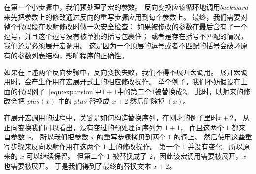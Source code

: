 在第一个小步骤中，我们预处理了宏的参数。
反向变换应该循环地调用$backward$来先把参数上的修改通过反向的重写步骤应用到每个参数上。
最终，我们需要对整个代码段在映射修改时做一次安全检查：
如果被修改的参数在最后含有了一个逗号，并且这个逗号没有被单独的括号包裹住；
或者是存在括号不匹配的情况，我们还是必须展开宏调用。
这是因为一个顶层的逗号或者不匹配的括号会破环原有的参数列表结构，影响程序的正确性。

如果在上述两个反向步骤中，反向变换失败，我们不得不展开宏调用。
展开宏调用时，会产生作用在宏展开式上的相应修改操作。
举个例子，我们不妨假设在上面的代码例子~\ref{eqn:expansion}中$1+1$中的第二个$1$被替换成$2$。
此时，映射来的修改会把 $plus(x)$ 中的 $plus$ 替换成 $x+2$ 然后删除掉 $(x)$。



在展开宏调用的过程中，关键是如何构造替换序列，在刚才的例子里时$x+2$。
从正向变换我们可以看出，没有变过的预处理词序列为 $1+1$， 
而且这两个 $1$ 都来自参数 $x$。
所以我们把参数 $x$ 的重写步骤拷贝到两个 $1$ 的词上。
然后使用这些重写步骤来反向映射作用在这两个 $1$ 上的修改操作。
第一个 $1$ 并没有变化，所以原来的 $x$ 可以继续保留。
但第二个 $1$ 被替换成了 $2$，因此该宏调用需要被展开，$x$ 也需要被展开。
于是我们得到了最终的替换文本 $x+2$。  


